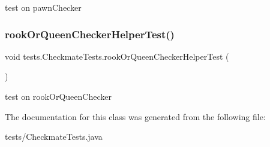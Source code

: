 test on pawn\+Checker \mbox{\label{classtests_1_1_checkmate_tests_a65507ac3ef2a1ab0240e8c9c597c1a5d}} 
\subsubsection{\texorpdfstring{rook\+Or\+Queen\+Checker\+Helper\+Test()}{rookOrQueenCheckerHelperTest()}}
{\footnotesize\ttfamily void tests.\+Checkmate\+Tests.\+rook\+Or\+Queen\+Checker\+Helper\+Test (\begin{DoxyParamCaption}{ }\end{DoxyParamCaption})\hspace{0.3cm}{\ttfamily [inline]}}

test on rook\+Or\+Queen\+Checker 

The documentation for this class was generated from the following file\+:\begin{DoxyCompactItemize}
\item 
tests/Checkmate\+Tests.\+java\end{DoxyCompactItemize}
